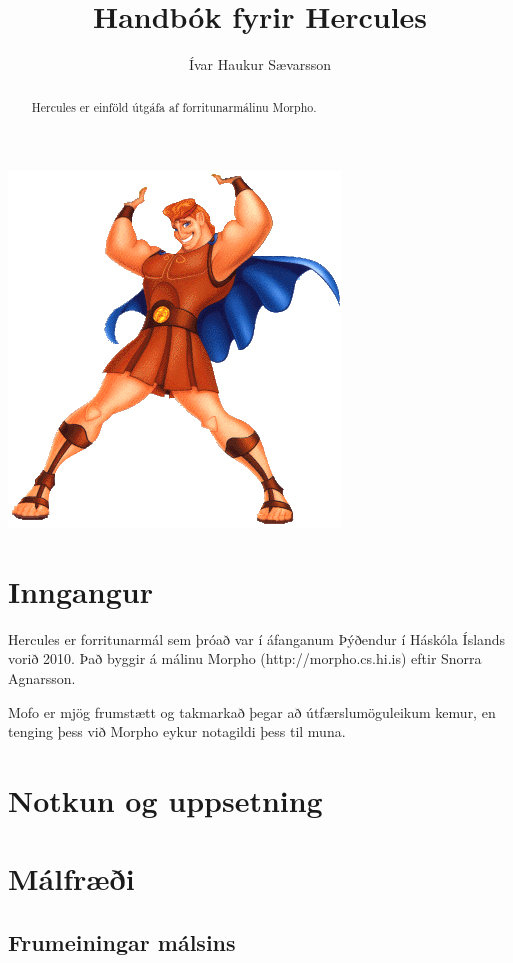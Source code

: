 \documentclass[12pt,a4paper]{article}
\begin{document}
\sloppy
\title{Handbók fyrir Hercules}
\author{Ívar Haukur Sævarsson}
\maketitle
\begin{center}
\includegraphics{hercules.png}
\end{center}
\pagebreak

\begin{abstract}
Hercules er einföld útgáfa af forritunarmálinu Morpho.
\end{abstract}

\tableofcontents

\section{Inngangur}
Hercules er forritunarmál sem þróað var í áfanganum Þýðendur í Háskóla Íslands vorið 2010.
Það byggir á málinu Morpho (http://morpho.cs.hi.is) eftir Snorra Agnarsson.

Mofo er mjög frumstætt og takmarkað þegar að útfærslumöguleikum kemur, en tenging þess við Morpho
eykur notagildi þess til muna.
\section{Notkun og uppsetning}
\section{Málfræði}
\subsection{Frumeiningar málsins}
\end{document}
